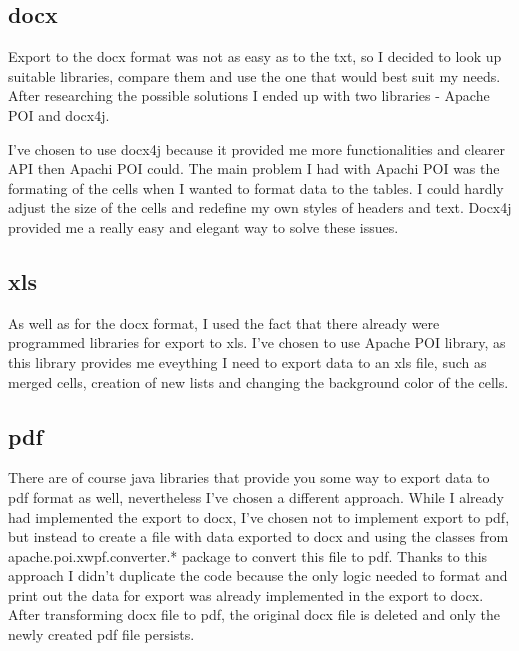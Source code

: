 \documentclass[thesis=B,english]{FITthesis}[2012/10/20]
\begin{document}
\subsection{docx}
Export to the docx format was not as easy as to the txt, so I decided to look up suitable libraries, compare them and use the one that would best suit my needs. After researching the possible solutions I ended up with two libraries - Apache POI and docx4j.

I've chosen to use docx4j because it provided me more functionalities and clearer API then Apachi POI could. The main problem I had with Apachi POI was the formating of the cells when I wanted to format data to the tables. I could hardly adjust the size of the cells and redefine my own styles of headers and text. Docx4j provided me a really easy and elegant way to solve these issues.
\subsection{xls}
As well as for the docx format, I used the fact that there already were programmed libraries for export to xls.
I've chosen to use Apache POI library, as this library provides me eveything I need to export data to an xls file, such as merged cells, creation of new lists and changing the background color of the cells.
\subsection{pdf}
There are of course java libraries that provide you some way to export data to pdf format as well, nevertheless I've chosen a different approach. While I already had implemented the export to docx, I've chosen not to implement export to pdf, but instead to create a file with data exported to docx and using the classes from apache.poi.xwpf.converter.* package to convert this file to pdf. Thanks to this approach I didn't duplicate the code because the only logic needed to format and print out the data for export was already implemented in the export to docx. After transforming docx file to pdf, the original docx file is deleted and only the newly created pdf file persists.
\end{document}
